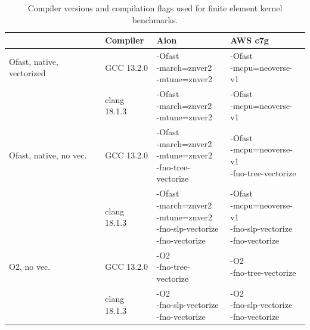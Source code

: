 \begin{table}
    \centering
    \footnotesize
    \renewcommand{\arraystretch}{1.5}
    \begin{tabular}{l|l|l|l}
                                    & Compiler     & Aion                                                                                            & AWS c7g \\ \hline \hline
        Ofast, native, vectorized   & GCC 13.2.0   & \makecell[l]{-Ofast \\ -march=znver2 \\ -mtune=znver2}                                          & \makecell[l]{-Ofast \\ -mcpu=neoverse-v1} \\ \hline
                                    & clang 18.1.3 & \makecell[l]{-Ofast \\ -march=znver2 \\ -mtune=znver2}                                          & \makecell[l]{-Ofast \\ -mcpu=neoverse-v1} \\ \hline
        Ofast, native, no vec.      & GCC 13.2.0   & \makecell[l]{-Ofast \\ -march=znver2 \\ -mtune=znver2 \\ -fno-tree-vectorize}                   & \makecell[l]{-Ofast \\ -mcpu=neoverse-v1 \\ -fno-tree-vectorize} \\ \hline
                                    & clang 18.1.3 & \makecell[l]{-Ofast \\ -march=znver2 \\ -mtune=znver2 \\ -fno-slp-vectorize \\ -fno-vectorize}  & \makecell[l]{-Ofast \\ -mcpu=neoverse-v1 \\ -fno-slp-vectorize \\ -fno-vectorize} \\ \hline
        O2, no vec.                 & GCC 13.2.0   & \makecell[l]{-O2 \\ -fno-tree-vectorize}                                                        & \makecell[l]{-O2 \\ -fno-tree-vectorize} \\ \hline
                                    & clang 18.1.3 & \makecell[l]{-O2 \\ -fno-slp-vectorize \\ -fno-vectorize}                                       & \makecell[l]{-O2 \\ -fno-slp-vectorize \\ -fno-vectorize} \\ \hline
    \end{tabular}
    \vspace{5pt}
    \caption{Compiler versions and compilation flags used for finite element kernel benchmarks.}
    \label{tab:compilers-kernels}
\end{table}

